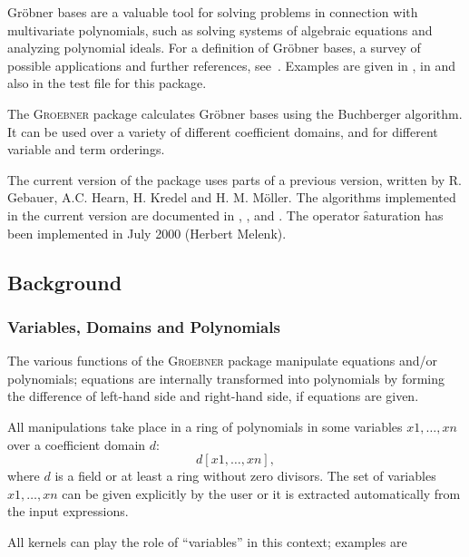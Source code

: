
\setcounter{examplectr}{0}


Gr\"obner bases are a valuable tool for solving problems in
connection with multivariate polynomials, such as solving systems of
algebraic equations and analyzing polynomial ideals. For a definition
of Gr\"obner bases, a survey of possible applications and further
references, see~\cite{Buchberger:85}. Examples are given in \cite{Boege:86},
in \cite{Buchberger:88} and also in the test file for this package.

 
The \textsc{Groebner} package calculates Gr\"obner bases using the
Buchberger algorithm.  It can be used over a variety of different
coefficient domains, and for different variable and term orderings.

The current version of the package uses parts of a previous
version, written by  R. Gebauer, A.C. Hearn, H. Kredel and H. M.
M\"oller. The algorithms implemented in the current version are
documented in \cite{Faugere:93}, \cite{Gebauer:88},
\cite{Kredel:88a} and \cite{Giovini:91}.
The operator \f{saturation} has been implemented in July 2000 (Herbert Melenk).

\subsection{Background}

\subsubsection{Variables, Domains and Polynomials}

The various functions of the \textsc{Groebner} package manipulate
equations and/or polynomials; equations are internally
transformed into  polynomials by forming the difference of
left-hand side and right-hand side, if equations are given.

All manipulations take place in a ring of polynomials in some
variables $x1, \ldots , xn$ over a coefficient domain $d$:
\[ d [x1,\ldots , xn], \]
where $d$ is a field or at least a ring without zero divisors.
The set of variables $x1,\ldots ,xn$ can be given explicitly by the
user or it is extracted automatically from the
input expressions.

All \REDUCE kernels can play the role of ``variables'' in this context;
examples are

